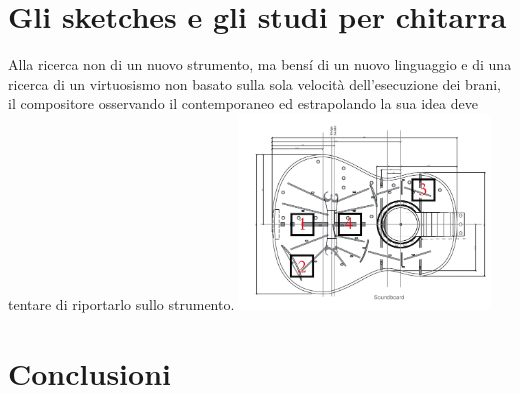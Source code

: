 \documentclass[oneside]{article}
\begin{document}
\begin{multicols*}{2}
\section{ Gli sketches e gli studi per chitarra}

Alla ricerca non di un nuovo strumento, ma bensí di un nuovo linguaggio e di una ricerca di un virtuosismo non basato sulla sola velocità dell’esecuzione dei brani, il compositore osservando il contemporaneo ed estrapolando la sua idea deve tentare di riportarlo sullo strumento.
\includegraphics[width=0.5\textwidth]{img/luoghi_perc.png}


\section{ Conclusioni}


\end{multicols*}
\end{document}

